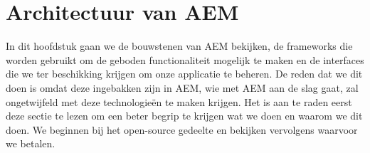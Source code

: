 \documentclass{article}
\begin{document}
	\section{Architectuur van AEM}
	In dit hoofdstuk gaan we de bouwstenen van AEM bekijken, de frameworks die worden gebruikt om de geboden functionaliteit mogelijk te maken en de interfaces die we ter beschikking krijgen om onze applicatie te beheren. De reden dat we dit doen is omdat deze ingebakken zijn in AEM, wie met AEM aan de slag gaat, zal ongetwijfeld met deze technologieën te maken krijgen. Het is aan te raden eerst deze sectie te lezen om een beter begrip te krijgen wat we doen en waarom we dit doen. We beginnen bij het open-source gedeelte en bekijken vervolgens waarvoor we betalen.
\end{document}
